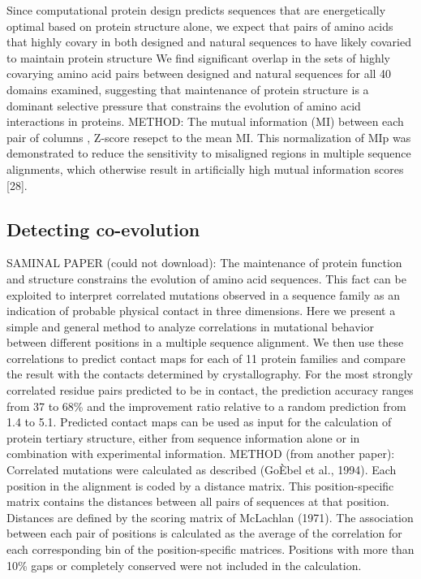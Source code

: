 Since computational protein design predicts sequences that are energetically optimal based on protein structure alone, we expect that pairs of amino acids that highly covary in both designed and natural sequences to have likely covaried to maintain protein structure \cite{ollikainen2013computational}
We find significant overlap in the sets of highly covarying amino acid pairs between designed and natural sequences for all 40 domains examined, suggesting that maintenance of protein structure is a dominant selective pressure that constrains the evolution of amino acid interactions in proteins. \cite{ollikainen2013computational}
METHOD: The mutual information (MI) between each pair of columns , Z-score resepct to the mean MI. This normalization of MIp was demonstrated to reduce the sensitivity to misaligned regions in multiple sequence alignments, which otherwise result in artificially high mutual information scores [28]. \cite{ollikainen2013computational}

\subsection{Detecting co-evolution}

SAMINAL PAPER (could not download): The maintenance of protein function and structure constrains the evolution of amino acid sequences. This fact can be exploited to interpret correlated mutations observed in a sequence family as an indication of probable physical contact in three dimensions. Here we present a simple and general method to analyze correlations in mutational behavior between different positions in a multiple sequence alignment. We then use these correlations to predict contact maps for each of 11 protein families and compare the result with the contacts determined by crystallography. For the most strongly correlated residue pairs predicted to be in contact, the prediction accuracy ranges from 37 to 68\% and the improvement ratio relative to a random prediction from 1.4 to 5.1. Predicted contact maps can be used as input for the calculation of protein tertiary structure, either from sequence information alone or in combination with experimental information.  \cite{gobel1994correlated}
METHOD (from another paper): Correlated mutations were calculated as described (GoÈbel et al., 1994). Each position in the alignment is coded by a distance matrix. This position-specific matrix contains the distances between all pairs of sequences at that position. Distances are defined by the scoring matrix of McLachlan (1971). The association between each pair of positions is calculated as the average of the correlation for each corresponding bin of the position-specific matrices. Positions with more than 10\% gaps or completely conserved were not included in the calculation. \cite{gobel1994correlated}


